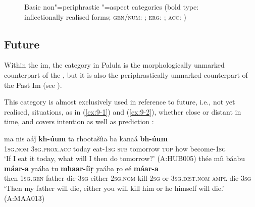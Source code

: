 \begin{figure}[ht]
\centering
{}
\caption{Basic non"=periphrastic "=aspect categories (bold type: inflectionally realised forms;
    \textsc{gen/num}: ; \textsc{erg}: ; \textsc{acc}:
     )}
\label{fig:9-1}
\end{figure}

\subsection{Future}
\label{subsec:9-1-2}

\largerpage
Within the im, the  category in Palula is the morphologically unmarked counterpart of the , but it is also the periphrastically unmarked counterpart of the Past Im (see ). 



This category is almost exclusively used in reference to future, i.e., not yet realised, situations, as in (\ref{ex:9-1}) and (\ref{ex:9-2}), whether close or distant in time, and covers intention as well as prediction \citep[105--108]{dahl1985}:


\begin{exe}
\ex
\label{ex:9-1}
\gll ma nis aáǰ \textbf{kh-úum} ta rhootašíia ba kanaá \textbf{bh-úum}\\
\textsc{1sg.nom} \textsc{3}\textsc{sg.prox.acc} today eat-\textsc{1sg} \textsc{sub} tomorrow \textsc{top} how become-\textsc{1sg}\\
\glt `If I eat it today, what will I then do tomorrow?' (A:HUB005)
\ex
\label{ex:9-2}
\gll thée míi báabu \textbf{máar-a} yaába tu \textbf{mhaar-íiṛ} yaába ṛo eé \textbf{máar-a} \\
then \textsc{1sg.gen} father die-\textsc{3sg} either \textsc{2sg.nom} kill-\textsc{2sg}  or \textsc{3sg.dist.nom} \textsc{ampl} die-\textsc{3sg}  \\
\glt `Then my father will die, either you will kill him or he himself will die.' (A:MAA013)
\end{exe}

